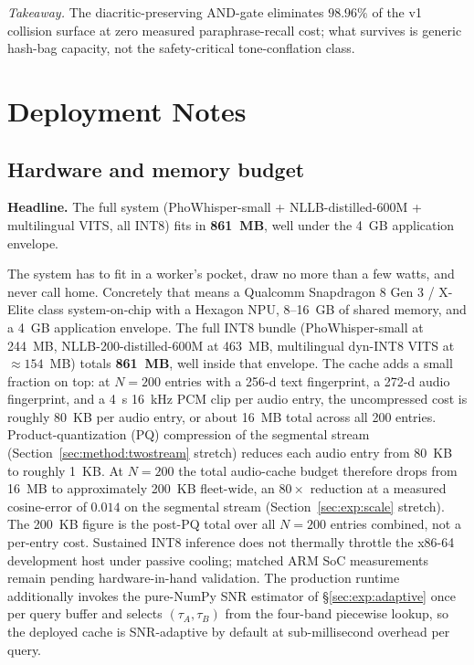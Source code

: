 \documentclass[a4paper,fleqn]{cas-dc}
\begin{document}
\noindent\textit{Takeaway.} The diacritic-preserving AND-gate eliminates $98.96\%$ of the v1 collision surface at zero measured paraphrase-recall cost; what survives is generic hash-bag capacity, not the safety-critical tone-conflation class.

\FloatBarrier
\section{Deployment Notes}\label{sec:deployment}

\subsection{Hardware and memory budget}\label{sec:dep:hw}
\textbf{Headline.} The full system (PhoWhisper-small + NLLB-distilled-600M + multilingual VITS, all INT8) fits in \textbf{861~MB}, well under the 4~GB application envelope.

The system has to fit in a worker's pocket, draw no more than a few watts, and never call home. Concretely that means a Qualcomm Snapdragon 8 Gen 3 / X-Elite class system-on-chip with a Hexagon NPU, 8--16~GB of shared memory, and a 4~GB application envelope. The full INT8 bundle (PhoWhisper-small at 244~MB, NLLB-200-distilled-600M at 463~MB, multilingual dyn-INT8 VITS at $\approx 154$~MB) totals \textbf{861~MB}, well inside that envelope. The cache adds a small fraction on top: at $N = 200$ entries with a 256-d text fingerprint, a 272-d audio fingerprint, and a 4~s 16~kHz PCM clip per audio entry, the uncompressed cost is roughly 80~KB per audio entry, or about 16~MB total across all 200 entries. Product-quantization (PQ) compression of the segmental stream (Section~\ref{sec:method:twostream} stretch) reduces each audio entry from 80~KB to roughly 1~KB. At $N = 200$ the total audio-cache budget therefore drops from 16~MB to approximately 200~KB fleet-wide, an $80\times$ reduction at a measured cosine-error of $0.014$ on the segmental stream (Section~\ref{sec:exp:scale} stretch). The 200~KB figure is the post-PQ total over all $N = 200$ entries combined, not a per-entry cost. Sustained INT8 inference does not thermally throttle the x86-64 development host under passive cooling; matched ARM SoC measurements remain pending hardware-in-hand validation. The production runtime additionally invokes the pure-NumPy SNR estimator of \S\ref{sec:exp:adaptive} once per query buffer and selects $(\tau_A, \tau_B)$ from the four-band piecewise lookup, so the deployed cache is SNR-adaptive by default at sub-millisecond overhead per query.
\end{document}
